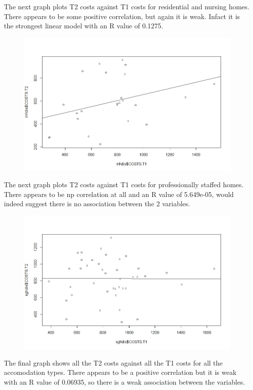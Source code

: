 \documentclass[]{article}
\begin{document}
\newpage
The next graph plots T2 costs against T1 costs for residential and nursing homes. There appears to be some positive correlation, but again it is weak. Infact it is the strongest linear model with an R value of 0.1275.
\begin{figure}[H]
\centering
\includegraphics[width=12cm]{RStudio/jpeg/Reg_RNH.jpeg}
\end{figure}
The next graph plots T2 costs against T1 costs for professionally staffed homes. There appears to be np correlation at all and an R value of 5.649e-05, would indeed suggest there is no association between the 2 variables.
\begin{figure}[H]
\centering
\includegraphics[width=12cm]{RStudio/jpeg/Reg_SGH.jpeg}
\end{figure}
\newpage
The final graph shows all the T2 costs against all the T1 costs for all the accomodation types. There appears to be a positive correlation but it is weak with an R value of 0.06935, so there is a weak association between the variables.
\end{document}
